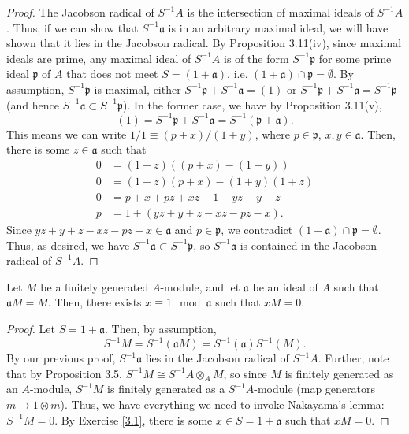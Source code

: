 \begin{proof}
The Jacobson radical of $S^{-1}A$ is the intersection of maximal ideals of $S^{-1}A$. Thus, if we can show that $S^{-1}\mathfrak{a}$ is in an arbitrary maximal ideal, we will have shown that it 
lies in the Jacobson radical. By Proposition 3.11(iv), since maximal ideals are prime, any maximal ideal of $S^{-1}A$
is of the form $S^{-1}\mathfrak{p}$ for some prime ideal $\mathfrak{p}$ of $A$ that does not meet $S = (1 + \mathfrak{a})$, i.e. $(1 + \mathfrak{a}) \cap \mathfrak{p} = \emptyset$. By assumption,
$S^{-1}\mathfrak{p}$ is maximal, either $S^{-1}\mathfrak{p} + S^{-1}\mathfrak{a} = (1)$ or $S^{-1}\mathfrak{p} + S^{-1}\mathfrak{a} = S^{-1}\mathfrak{p}$ (and hence $S^{-1}\mathfrak{a} \subset S^{-1}\mathfrak{p}$).
In the former case, we have by Proposition 3.11(v),
$$(1) = S^{-1}\mathfrak{p} + S^{-1}\mathfrak{a} = S^{-1}(\mathfrak{p} + \mathfrak{a}).$$
This means we can write $1/1 \equiv (p + x)/(1 + y)$, where $p \in \mathfrak{p}$, $x,y \in \mathfrak{a}$. Then, there is some $z \in \mathfrak{a}$ such that
\begin{align*}
0 &= (1+z)((p+x) - (1+y)) \\
0 &= (1+z)(p+x) - (1+y)(1+z) \\
0 &= p + x + pz + xz - 1 - yz - y - z \\
p &= 1 + (yz + y + z - xz - pz - x).
\end{align*}
Since $yz + y + z - xz - pz - x \in \mathfrak{a}$ and $p \in \mathfrak{p}$, we contradict $(1 + \mathfrak{a}) \cap \mathfrak{p} = \emptyset$. Thus, as desired, we have $S^{-1}\mathfrak{a} \subset S^{-1}\mathfrak{p}$, so
$S^{-1}\mathfrak{a}$ is contained in the Jacobson radical of $S^{-1}A$.
\end{proof}

Let $M$ be a finitely generated $A$-module, and let $\mathfrak{a}$ be an ideal of $A$ such that $\mathfrak{a}M = M$. Then, there exists $x \equiv 1\mod\mathfrak{a}$ such that $xM = 0$.

\begin{proof}
Let $S = 1 + \mathfrak{a}$. Then, by assumption,
$$S^{-1}M = S^{-1}(\mathfrak{a}M) = S^{-1}(\mathfrak{a})S^{-1}(M).$$
By our previous proof, $S^{-1}\mathfrak{a}$ lies in the Jacobson radical of $S^{-1}A$. Further, note that by Proposition 3.5, $S^{-1}M \cong S^{-1}A \otimes_A M$, so since $M$ is finitely generated
as an $A$-module, $S^{-1}M$ is finitely generated as a $S^{-1}A$-module (map generators $m \mapsto 1 \otimes m$). Thus, we have everything we need to invoke Nakayama's lemma: $S^{-1}M = 0$. By Exercise \ref{3.1},
there is some $x \in S = 1+\mathfrak{a}$ such that $xM = 0$.
\end{proof}

